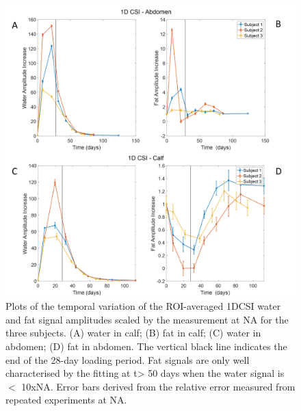 \documentclass[class=article, crop=false]{standalone}
\begin{document}
\begin{figure}
    \centering
    \includegraphics[width=1\textwidth]{Figures/Lipid/1DCSI_Amplitude.png}
    \caption{Plots of the temporal variation of the ROI-averaged 1DCSI water and fat signal amplitudes scaled by the measurement at NA for the three subjects. (A) water in calf; (B) fat in calf; (C) water in abdomen; (D) fat in abdomen. The vertical black line indicates the end of the 28-day loading period. Fat signals are only well characterised by the fitting at t> 50 days when the water signal is $<$ 10xNA.  Error bars derived from the relative error measured from repeated experiments at NA.}
    \label{fig:Lip:1DCSI}
\end{figure}
\end{document}
